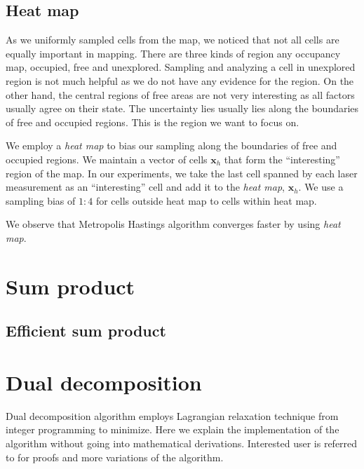 \documentclass[letterpaper, 10 pt, conference]{ieeeconf} %
\newcommand{\vect}[1]{\mathbf{#1}}
\begin{document}
\subsection{Heat map}
As we uniformly sampled cells from the map, we noticed that not all
cells are equally important in mapping. There are three kinds of region any
occupancy map, occupied, free and unexplored. Sampling and analyzing a cell in
unexplored region is not much helpful as we do not have any evidence for the
region. On the other hand, the central regions of free areas are not very
interesting as all factors usually agree on their state. The uncertainty lies
usually lies along the boundaries of free and occupied regions. This is the
region we want to focus on.

We employ a \emph{heat map} to bias our sampling along the boundaries of free and occupied regions. We maintain a vector of cells $\vect{x}_h$ that form the ``interesting'' region of the map. In our experiments, we take the last cell spanned by each laser measurement as an ``interesting'' cell and add it to the \emph{heat map}, $\vect{x}_h$. We use a sampling bias of $1:4$ for cells outside heat map to cells within heat map.

We observe that Metropolis Hastings algorithm converges faster by using \emph{heat map}.

\section{Sum product}
% 

\subsection{Efficient sum product}
\section{Dual decomposition}
\newcommand{\msg}[3]{\mu_{#1#2}(#3)}
\newcommand{\assign}{\leftarrow}
\newcommand{\Sx}{L_i}
Dual decomposition algorithm employs Lagrangian relaxation technique from integer programming to minimize. Here we explain the implementation of the algorithm without going into mathematical derivations. Interested user is referred to \cite{sontag2011introduction,jojic2010accelerated,komodakis2009beyond} for proofs and more variations of the algorithm. 
\end{document}
